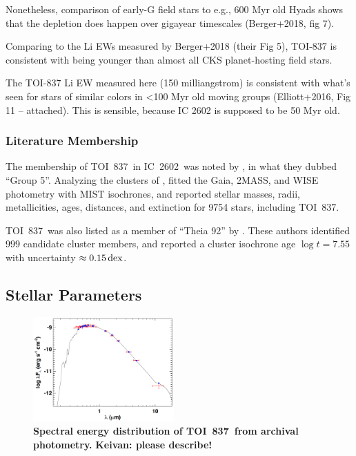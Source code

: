 \documentclass[12pt,twocolumn,tighten]{aastex62}
\newcommand{\tn}{TOI~837} %
\newcommand{\cn}{IC~2602} %
\begin{document}
Nonetheless, comparison of early-G field stars to e.g., 600 Myr old
Hyads shows that the depletion does happen over gigayear timescales
(Berger+2018, fig 7).

Comparing to the Li EWs measured by Berger+2018 (their Fig 5),
TOI-837 is consistent with being younger than almost all CKS
planet-hosting field stars.

The TOI-837 Li EW measured here (150 milliangstrom) is consistent
with what's seen for stars of similar colors in <100 Myr old moving
groups (Elliott+2016, Fig 11 -- attached).  This is sensible, because
IC 2602 is supposed to be 50 Myr old.


\subsubsection{Literature Membership}
The membership of \tn\ in \cn\ was noted by \citet{oh_comoving_2017},
in what they dubbed ``Group 5''.
Analyzing the clusters of \citet{oh_comoving_2017},
\citet{bochanski_fundamental_2018} fitted the Gaia, 2MASS, and
WISE photometry with MIST isochrones, and reported stellar masses,
radii, metallicities, ages, distances, and extinction for 9754 stars,
including \tn.

\tn\ was also listed as a member of ``Theia 92'' by
\citet{kounkel_untangling_2019}.
These authors identified 999 candidate cluster members, and
reported a cluster isochrone age $\log t = 7.55$ with uncertainty
$\approx 0.15\,{\rm dex}$.


\subsection{Stellar Parameters}

\begin{figure}[t!]
	\begin{center}
		\leavevmode
		\includegraphics[width=0.48\textwidth]{f6.png}
	\end{center}
	\vspace{-0.7cm}
	\caption{
    {\bf Spectral energy distribution of \tn\ from archival
    photometry.}
    {\bf Keivan: please describe!}
    \label{fig:sed}
	}
\end{figure}
\end{document}
